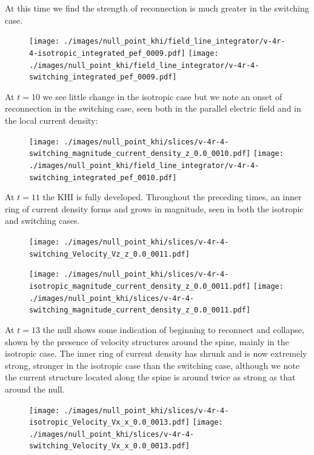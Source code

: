 At this time we find the strength of reconnection is much greater in the switching case.

\begin{figure}[H]
  \centering
  \texttt{[image: ./images/null\_point\_khi/field\_line\_integrator/v-4r-4-isotropic\_integrated\_pef\_0009.pdf]}
  \texttt{[image: ./images/null\_point\_khi/field\_line\_integrator/v-4r-4-switching\_integrated\_pef\_0009.pdf]}
\end{figure}

At $t=10$ we see little change in the isotropic case but we note an onset of reconnection in the switching case, seen both in the parallel electric field and in the local current density:

\begin{figure}[H]
  \centering
  \texttt{[image: ./images/null\_point\_khi/slices/v-4r-4-switching\_magnitude\_current\_density\_z\_0.0\_0010.pdf]}
  \texttt{[image: ./images/null\_point\_khi/field\_line\_integrator/v-4r-4-switching\_integrated\_pef\_0010.pdf]}
\end{figure}

At $t=11$ the KHI is fully developed. Throughout the preceding times, an inner ring of current density forms and grows in magnitude, seen in both the isotropic and switching cases.

\begin{figure}[H]
  \centering
  \texttt{[image: ./images/null\_point\_khi/slices/v-4r-4-switching\_Velocity\_Vz\_z\_0.0\_0011.pdf]}
\end{figure}

\begin{figure}[H]
  \centering
  \texttt{[image: ./images/null\_point\_khi/slices/v-4r-4-isotropic\_magnitude\_current\_density\_z\_0.0\_0011.pdf]}
  \texttt{[image: ./images/null\_point\_khi/slices/v-4r-4-switching\_magnitude\_current\_density\_z\_0.0\_0011.pdf]}
\end{figure}

At $t=13$ the null shows some indication of beginning to reconnect and collapse, shown by the presence of velocity structures around the spine, mainly in the isotropic case. The inner ring of current density has shrunk and is now extremely strong, stronger in the isotropic case than the switching case, although we note the current structure located along the spine is around twice as strong as that around the null.

\begin{figure}[H]
  \centering
  \texttt{[image: ./images/null\_point\_khi/slices/v-4r-4-isotropic\_Velocity\_Vx\_x\_0.0\_0013.pdf]}
  \texttt{[image: ./images/null\_point\_khi/slices/v-4r-4-switching\_Velocity\_Vx\_x\_0.0\_0013.pdf]}
\end{figure}

